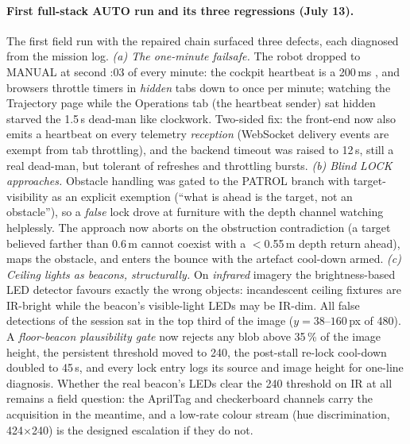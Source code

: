 \paragraph{First full-stack AUTO run and its three regressions (July 13).}
The first field run with the repaired chain surfaced three defects, each
diagnosed from the mission log. \emph{(a) The one-minute failsafe.} The
robot dropped to MANUAL at second :03 of every minute: the cockpit
heartbeat is a 200\,ms , and browsers throttle timers in
\emph{hidden} tabs down to once per minute; watching the Trajectory page
while the Operations tab (the heartbeat sender) sat hidden starved the
1.5\,s dead-man like clockwork. Two-sided fix: the front-end now also emits
a heartbeat on every telemetry \emph{reception} (WebSocket delivery events
are exempt from tab throttling), and the backend timeout was raised to
12\,s, still a real dead-man, but tolerant of refreshes and throttling
bursts. \emph{(b) Blind LOCK approaches.} Obstacle handling was gated to
the PATROL branch with target-visibility as an explicit exemption
(``what is ahead is the target, not an obstacle''), so a \emph{false} lock
drove at furniture with the depth channel watching helplessly. The approach
now aborts on the obstruction contradiction (a target believed farther
than 0.6\,m cannot coexist with a $<$0.55\,m depth return ahead), maps
the obstacle, and enters the bounce with the artefact cool-down armed.
\emph{(c) Ceiling lights as beacons, structurally.} On \emph{infrared}
imagery the brightness-based LED detector favours exactly the wrong
objects: incandescent ceiling fixtures are IR-bright while the beacon's
visible-light LEDs may be IR-dim. All false detections of the session sat
in the top third of the image ($y = 38$--$160$\,px of 480). A
\emph{floor-beacon plausibility gate} now rejects any blob above 35\,\%
of the image height, the persistent threshold moved to 240, the post-stall
re-lock cool-down doubled to 45\,s, and every lock entry logs its source
and image height for one-line diagnosis. Whether the real beacon's LEDs
clear the 240 threshold on IR at all remains a field question: the
AprilTag and checkerboard channels carry the acquisition in the meantime,
and a low-rate colour stream (hue discrimination, 424$\times$240) is the
designed escalation if they do not.

